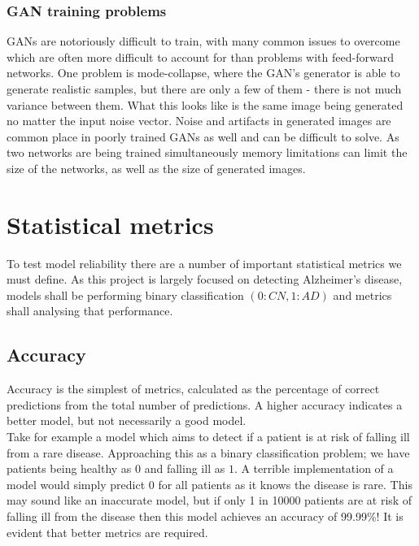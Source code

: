\documentclass[
    author={Kai Hulme},
    supervisor={Dr Jon Bird},
    degree={BSc},
    title={Generative Adversarial Networks as an Augmentation Technique},
    subtitle={for Alzheimer's Disease Detection in MRI Volumes},
    type={Research},
    year={2021} 
]{dissertation}
\begin{document}
\subsubsection{GAN training problems}
\label{gan_training_is_difficult}

GANs are notoriously difficult to train, with many common issues to overcome which are often more difficult to account for than problems with feed-forward networks. One problem is mode-collapse, where the GAN's generator is able to generate realistic samples, but there are only a few of them - there is not much variance between them. What this looks like is the same image being generated no matter the input noise vector. Noise and artifacts in generated images are common place in poorly trained GANs as well and can be difficult to solve. As two networks are being trained simultaneously memory limitations can limit the size of the networks, as well as the size of generated images.


\section{Statistical metrics}

To test model reliability there are a number of important statistical metrics we must define. As this project is largely focused on detecting Alzheimer's disease, models shall be performing binary classification $(0: CN, 1:AD)$ and metrics shall analysing that performance.

\subsection{Accuracy}

Accuracy is the simplest of metrics, calculated as the percentage of correct predictions from the total number of predictions. A higher accuracy indicates a better model, but not necessarily a good model. \\

Take for example a model which aims to detect if a patient is at risk of falling ill from a rare disease. Approaching this as a binary classification problem; we have patients being healthy as $0$ and falling ill as $1$. A terrible implementation of a model would simply predict $0$ for all patients as it knows the disease is rare. This may sound like an inaccurate model, but if only 1 in 10000 patients are at risk of falling ill from the disease then this model achieves an accuracy of 99.99\%! It is evident that better metrics are required. \\
\end{document}
